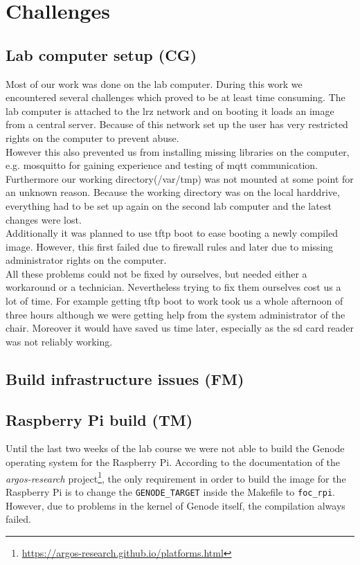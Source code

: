 \section{Challenges}
\label{sec:challenges}


\subsection{Lab computer setup (CG)}
Most of our work was done on the lab computer. During this work we encountered several challenges which proved to be at least time consuming. The lab computer is attached to the lrz network and on booting it loads an image from a central server. Because of this network set up the user has very restricted rights on the computer to prevent abuse.\\

However this also prevented us from installing missing libraries on the computer, e.g. mosquitto for gaining experience and testing of mqtt communication. Furthermore our working directory(/var/tmp) was not mounted at some point for an unknown reason. Because the working directory was on the local harddrive, everything had to be set up again on the second lab computer and the latest changes were lost.\\

Additionally it was planned to use tftp boot to ease booting a newly compiled image. However, this first failed due to firewall rules and later due to missing administrator rights on the computer.\\

All these problems could not be fixed by ourselves, but needed either a workaround or a technician. Nevertheless trying to fix them ourselves cost us a lot of time. For example getting tftp boot to work took us a whole afternoon of three hours although we were getting help from the system administrator of the chair. Moreover it would have saved us time later, especially as the sd card reader was not reliably working.

\subsection{Build infrastructure issues (FM)}


\subsection{Raspberry Pi build (TM)}
\label{sec:pi-problems}
Until the last two weeks of the lab course we were not able to build the Genode operating system for the Raspberry Pi. According to the documentation of the \textit{argos-research} project\footnote{\url{https://argos-research.github.io/platforms.html}}, the only requirement in order to build the image for the Raspberry Pi is to change the \texttt{GENODE\_TARGET} inside the Makefile to \texttt{foc\_rpi}. However, due to problems in the kernel of Genode itself, the compilation always failed. \\

